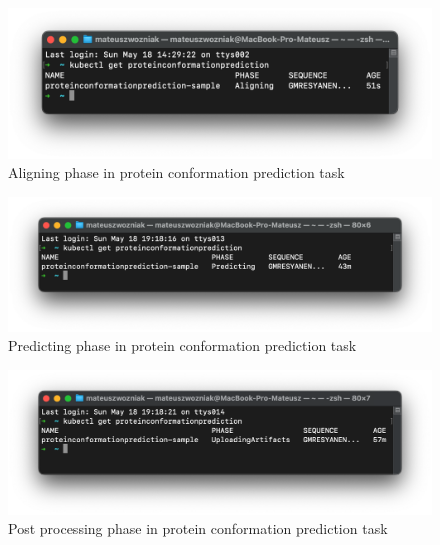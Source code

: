
\begin{figure}[htbp]
    \centering
    \includegraphics[width=\textwidth]{images/proteinconformationprediction_aligning_terminal}
    \caption{Aligning phase in protein conformation prediction task}
    \label{fig:proteinconformationprediction_aligning_terminal}
\end{figure}

\begin{figure}[htbp]
    \centering
    \includegraphics[width=\textwidth]{images/proteinconformationprediction_predicting_terminal}
    \caption{Predicting phase in protein conformation prediction task}
    \label{fig:proteinconformationprediction_predicting_terminal}
\end{figure}

\begin{figure}[htbp]
    \centering
    \includegraphics[width=\textwidth]{images/proteinconformationprediction_uploading_terminal}
    \caption{Post processing phase in protein conformation prediction task}
    \label{fig:proteinconformationprediction_uploading_terminal}
\end{figure}

